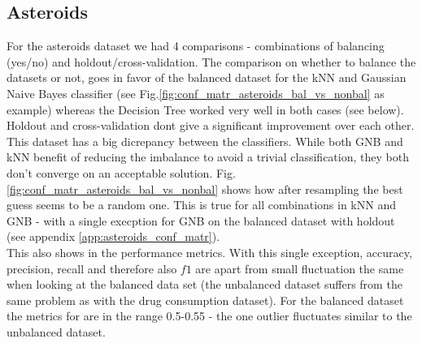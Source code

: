 \documentclass{article}
\begin{document}
\subsection{Asteroids}

For the asteroids dataset we had 4 comparisons - combinations of balancing (yes/no) and holdout/cross-validation. The comparison on whether to balance the datasets or not, goes in favor of the balanced dataset for the kNN and Gaussian Naive Bayes classifier (see Fig.\ref{fig:conf_matr_asteroids_bal_vs_nonbal} as example) whereas the Decision Tree worked very well in both cases (see below). Holdout and cross-validation dont give a significant improvement over each other. \\

This dataset has a big dicrepancy between the classifiers. While both GNB and kNN benefit of reducing the imbalance to avoid a trivial classification, they both don't converge on an acceptable solution. Fig.\ref{fig:conf_matr_asteroids_bal_vs_nonbal} shows how after resampling the best guess seems to be a random one. This is true for all combinations in kNN and GNB - with a single execption for GNB on the balanced dataset with holdout (see appendix \ref{app:asteroids_conf_matr}). \\
This also shows in the performance metrics. With this single exception, accuracy, precision, recall and therefore also $f1$ are apart from small fluctuation the same when looking at the balanced data set (the unbalanced dataset suffers from the same problem as with the drug consumption dataset). For the balanced dataset the metrics for are in the range 0.5-0.55 - the one outlier fluctuates similar to the unbalanced dataset.
\end{document}
